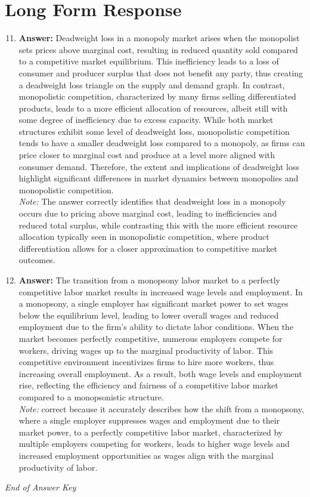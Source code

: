 \documentclass[12pt]{article}
\begin{document}
\section*{Long Form Response}
\begin{enumerate}[label=\arabic*.]
\setcounter{enumi}{10}
\item \textbf{Answer:} Deadweight loss in a monopoly market arises when the monopolist sets prices above marginal cost, resulting in reduced quantity sold compared to a competitive market equilibrium. This inefficiency leads to a loss of consumer and producer surplus that does not benefit any party, thus creating a deadweight loss triangle on the supply and demand graph. In contrast, monopolistic competition, characterized by many firms selling differentiated products, leads to a more efficient allocation of resources, albeit still with some degree of inefficiency due to excess capacity. While both market structures exhibit some level of deadweight loss, monopolistic competition tends to have a smaller deadweight loss compared to a monopoly, as firms can price closer to marginal cost and produce at a level more aligned with consumer demand. Therefore, the extent and implications of deadweight loss highlight significant differences in market dynamics between monopolies and monopolistic competition.
\\ \textit{Note:} The answer correctly identifies that deadweight loss in a monopoly occurs due to pricing above marginal cost, leading to inefficiencies and reduced total surplus, while contrasting this with the more efficient resource allocation typically seen in monopolistic competition, where product differentiation allows for a closer approximation to competitive market outcomes.
\item \textbf{Answer:} The transition from a monopsony labor market to a perfectly competitive labor market results in increased wage levels and employment. In a monopsony, a single employer has significant market power to set wages below the equilibrium level, leading to lower overall wages and reduced employment due to the firm's ability to dictate labor conditions. When the market becomes perfectly competitive, numerous employers compete for workers, driving wages up to the marginal productivity of labor. This competitive environment incentivizes firms to hire more workers, thus increasing overall employment. As a result, both wage levels and employment rise, reflecting the efficiency and fairness of a competitive labor market compared to a monopsonistic structure.
\\ \textit{Note:} correct because it accurately describes how the shift from a monopsony, where a single employer suppresses wages and employment due to their market power, to a perfectly competitive labor market, characterized by multiple employers competing for workers, leads to higher wage levels and increased employment opportunities as wages align with the marginal productivity of labor.
\end{enumerate}

\vfill
\noindent\textit{End of Answer Key}
\end{document}
